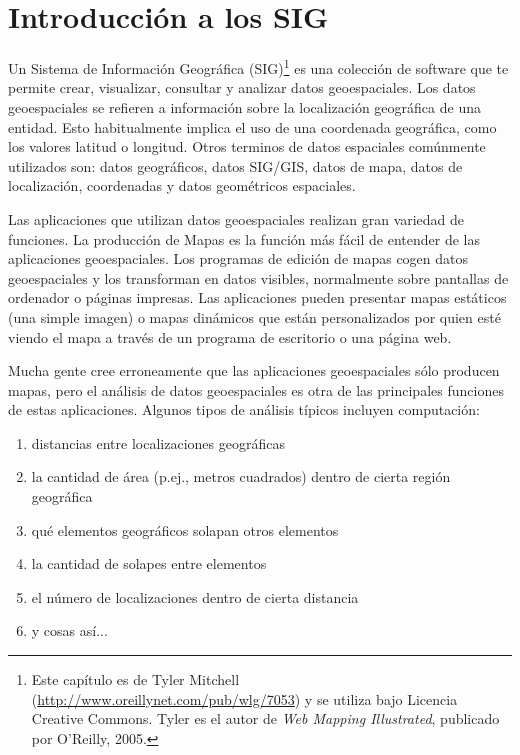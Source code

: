 
\section{Introducción a los SIG}\label{label_intro}

Un Sistema de Información Geográfica (SIG)\cite{mitchel05}\footnote{Este 
capítulo es de Tyler Mitchell (\url{http://www.oreillynet.com/pub/wlg/7053}) y 
se utiliza bajo Licencia Creative Commons. Tyler es el autor de 
\textit{Web Mapping Illustrated}, publicado por O'Reilly, 2005.}
es una colección de software que te permite crear, visualizar, consultar y 
analizar datos geoespaciales. Los datos geoespaciales se refieren a 
información sobre la localización geográfica de una entidad. Esto 
habitualmente implica el uso de una coordenada geográfica, como los valores 
latitud o longitud. Otros terminos de datos espaciales comúnmente utilizados 
son: datos geográficos, datos SIG/GIS, datos de mapa, datos de localización, 
coordenadas y datos geométricos espaciales.

Las aplicaciones que utilizan datos geoespaciales realizan gran variedad de 
funciones. La producción de Mapas es la función más fácil de entender de 
las aplicaciones geoespaciales. Los programas de edición de mapas cogen datos 
geoespaciales y los transforman en datos visibles, normalmente sobre pantallas
de ordenador o páginas impresas.
Las aplicaciones pueden presentar mapas estáticos (una simple imagen) o mapas
dinámicos que están personalizados por quien esté viendo el mapa a través de 
un programa de escritorio o una página web.

Mucha gente cree erroneamente que las aplicaciones geoespaciales sólo producen
mapas, pero el análisis de datos geoespaciales es otra de las principales 
funciones de estas aplicaciones. Algunos tipos de análisis típicos incluyen
computación:

\begin{enumerate}
\item distancias entre localizaciones geográficas
\item la cantidad de área (p.ej., metros cuadrados) dentro de cierta región
geográfica
\item qué elementos geográficos solapan otros elementos
\item la cantidad de solapes entre elementos
\item el número de localizaciones dentro de cierta distancia
\item y cosas así...
\end{enumerate}


